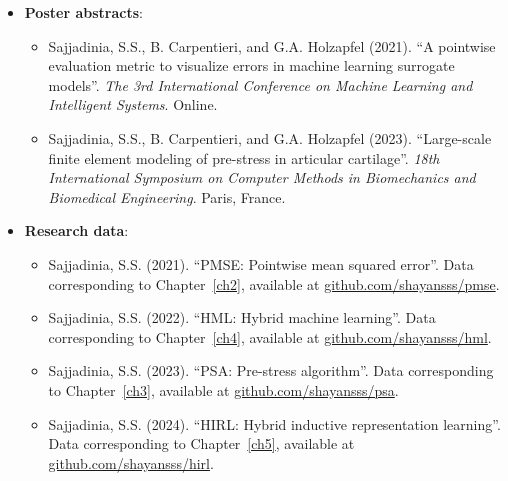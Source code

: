 \begin{itemize}
\begin{itemize}
\end{itemize}
\item \textbf{Poster abstracts}:
\begin{itemize}
    \item Sajjadinia, S.S., B. Carpentieri, and G.A. Holzapfel (2021). “A pointwise evaluation metric to visualize errors in machine learning surrogate models”. \textit{The 3rd International Conference on Machine Learning and Intelligent Systems}. Online.
    \item Sajjadinia, S.S., B. Carpentieri, and G.A. Holzapfel (2023). “Large-scale finite element modeling of pre-stress in articular cartilage”. \textit{18th International Symposium on Computer Methods in Biomechanics and Biomedical Engineering}. Paris, France.
\end{itemize}
\item \textbf{Research data}:
\begin{itemize}
    \item Sajjadinia, S.S. (2021). “PMSE: Pointwise mean squared error”. Data corresponding to Chapter~\ref{ch2}, available at \href{https://github.com/shayansss/pmse}{github.com/shayansss/pmse}.
    \item Sajjadinia, S.S. (2022). “HML: Hybrid machine learning”. Data corresponding to Chapter~\ref{ch4}, available at \href{https://github.com/shayansss/hml}{github.com/shayansss/hml}.
    \item Sajjadinia, S.S. (2023). “PSA: Pre-stress algorithm”. Data corresponding to Chapter~\ref{ch3}, available at \href{https://github.com/shayansss/psa}{github.com/shayansss/psa}.
    \item Sajjadinia, S.S. (2024). “HIRL: Hybrid inductive representation learning”. Data corresponding to Chapter~\ref{ch5}, available at \href{https://github.com/shayansss/hirl}{github.com/shayansss/hirl}.
\end{itemize}
\end{itemize}


